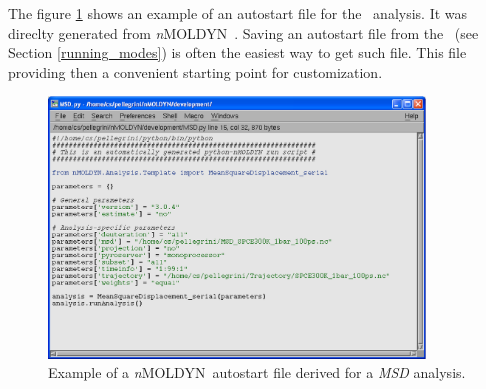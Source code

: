 \documentclass[a4paper,11pt]{report}
\newcommand{\NMOLDYN}{\textit{n}MOLDYN}
\begin{document}
The figure \ref{fig:msd_autostart_file} shows an example of an autostart file for the \MSD\ analysis. It was direclty 
generated from \NMOLDYN\ \GUI . Saving an autostart file from the \GUI\ (see Section \ref{running_modes}) is often the 
easiest way to get such file. This file providing then  a convenient starting point for customization. 
\begin{figure}[h!]
\begin{center}
\includegraphics[width=10cm]{Figures/msd_autostart_file.eps}
\end{center}
\caption[Example of autostart file]{Example of a \NMOLDYN\ autostart file derived for a \textit{MSD} analysis.}
\label{fig:msd_autostart_file}
\end{figure}
\newpage
\end{document}
